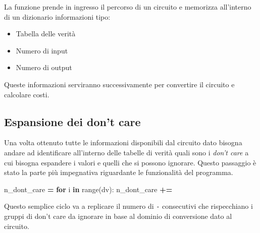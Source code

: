 \documentclass[
  italian,
]{book}
\newenvironment{Shaded}{\begin{snugshade}}{\end{snugshade}}
\newcommand{\BuiltInTok}[1]{#1}
\newcommand{\ControlFlowTok}[1]{\textcolor[rgb]{0.13,0.29,0.53}{\textbf{#1}}}
\newcommand{\KeywordTok}[1]{\textcolor[rgb]{0.13,0.29,0.53}{\textbf{#1}}}
\newcommand{\NormalTok}[1]{#1}
\newcommand{\OperatorTok}[1]{\textcolor[rgb]{0.81,0.36,0.00}{\textbf{#1}}}
\newcommand{\StringTok}[1]{\textcolor[rgb]{0.31,0.60,0.02}{#1}}
\providecommand{\tightlist}{%
  \setlength{\itemsep}{0pt}\setlength{\parskip}{0pt}}
\begin{document}
La funzione prende in ingresso il percorso di un circuito e memorizza all'interno di un dizionario informazioni tipo:

\begin{itemize}
\tightlist
\item
  Tabella delle verità
\item
  Numero di input
\item
  Numero di output
\end{itemize}

Queste informazioni serviranno successivamente per convertire il circuito e calcolare costi.

\hypertarget{espansione-dei-dont-care}{%
\subsection{Espansione dei don't care}\label{espansione-dei-dont-care}}

Una volta ottenuto tutte le informazioni disponibili dal circuito dato bisogna andare ad identificare all'interno delle tabelle di verità quali sono i \emph{don't care} a cui bisogna espandere i valori e quelli che si possono ignorare. Questo passaggio è stato la parte più impegnativa riguardante le funzionalità del programma.

\begin{Shaded}
\begin{Highlighting}[]
\NormalTok{n\_dont\_care }\OperatorTok{=} \StringTok{\textquotesingle{}\textquotesingle{}}
    \ControlFlowTok{for}\NormalTok{ i }\KeywordTok{in} \BuiltInTok{range}\NormalTok{(dv):}
\NormalTok{        n\_dont\_care }\OperatorTok{+=} \StringTok{\textquotesingle{}{-}\textquotesingle{}}
\end{Highlighting}
\end{Shaded}

\newpage

Questo semplice ciclo va a replicare il numero di \texttt{-} consecutivi che rispecchiano i gruppi di don't care da ignorare in base al dominio di conversione dato al circuito.
\end{document}
